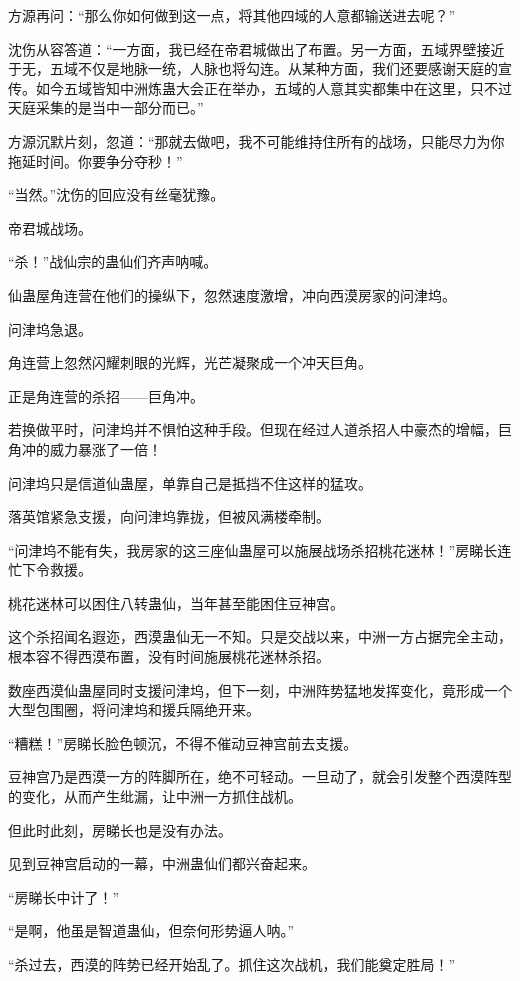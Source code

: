 \begin{this_body}
方源再问：“那么你如何做到这一点，将其他四域的人意都输送进去呢？”

沈伤从容答道：“一方面，我已经在帝君城做出了布置。另一方面，五域界壁接近于无，五域不仅是地脉一统，人脉也将勾连。从某种方面，我们还要感谢天庭的宣传。如今五域皆知中洲炼蛊大会正在举办，五域的人意其实都集中在这里，只不过天庭采集的是当中一部分而已。”

方源沉默片刻，忽道：“那就去做吧，我不可能维持住所有的战场，只能尽力为你拖延时间。你要争分夺秒！”

“当然。”沈伤的回应没有丝毫犹豫。

帝君城战场。

“杀！”战仙宗的蛊仙们齐声呐喊。

仙蛊屋角连营在他们的操纵下，忽然速度激增，冲向西漠房家的问津坞。

问津坞急退。

角连营上忽然闪耀刺眼的光辉，光芒凝聚成一个冲天巨角。

正是角连营的杀招——巨角冲。

若换做平时，问津坞并不惧怕这种手段。但现在经过人道杀招人中豪杰的增幅，巨角冲的威力暴涨了一倍！

问津坞只是信道仙蛊屋，单靠自己是抵挡不住这样的猛攻。

落英馆紧急支援，向问津坞靠拢，但被风满楼牵制。

“问津坞不能有失，我房家的这三座仙蛊屋可以施展战场杀招桃花迷林！”房睇长连忙下令救援。

桃花迷林可以困住八转蛊仙，当年甚至能困住豆神宫。

这个杀招闻名遐迩，西漠蛊仙无一不知。只是交战以来，中洲一方占据完全主动，根本容不得西漠布置，没有时间施展桃花迷林杀招。

数座西漠仙蛊屋同时支援问津坞，但下一刻，中洲阵势猛地发挥变化，竟形成一个大型包围圈，将问津坞和援兵隔绝开来。

“糟糕！”房睇长脸色顿沉，不得不催动豆神宫前去支援。

豆神宫乃是西漠一方的阵脚所在，绝不可轻动。一旦动了，就会引发整个西漠阵型的变化，从而产生纰漏，让中洲一方抓住战机。

但此时此刻，房睇长也是没有办法。

见到豆神宫启动的一幕，中洲蛊仙们都兴奋起来。

“房睇长中计了！”

“是啊，他虽是智道蛊仙，但奈何形势逼人呐。”

“杀过去，西漠的阵势已经开始乱了。抓住这次战机，我们能奠定胜局！”


\end{this_body}
